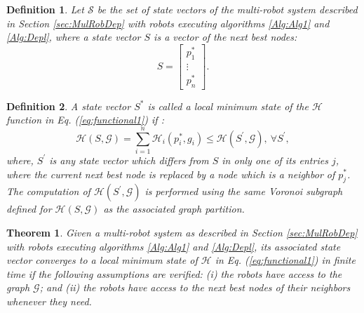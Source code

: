 \documentclass[smallcondensed]{svjour3}
\newtheorem{mytheorem}{Theorem}
\newtheorem{mydef}{Definition}
\begin{document}
%
\begin{mydef}
Let $\mathcal S$ be the set of state vectors of the multi-robot system described in Section \ref{sec:MulRobDep} with robots executing algorithms \ref{Alg:Alg1} and \ref{Alg:Depl}, where a state vector $S$ is a vector of the next best nodes:
%
\[
S=
\begin{bmatrix}
p_1^*\\
\vdots\\
p_n^*
\end{bmatrix}.\]
\end{mydef}

\begin{mydef}
\label{def4}
A state vector $S^*$ is called a local minimum state of the $\mathcal H$ function in Eq. (\ref{eq:functional1}) if :
%
\[\mathcal H(S,\mathcal G)=\sum_{i = 1}^{n} \mathcal H_i(p_i^*,g_i) \leq \mathcal H(S^\prime,\mathcal G), ~\forall S^\prime, \]
%
where, $S^\prime$ is any state vector which differs from $S$ in only one of its entries $j$, where the current next best node is replaced by a node which is a neighbor of $p_j^*$. The computation of $\mathcal H(S^\prime, \mathcal G)$ is performed using the same Voronoi subgraph defined for $\mathcal H(S,\mathcal G)$ as the associated graph partition.
\end{mydef}

\begin{mytheorem}
Given a multi-robot system as described in Section \ref{sec:MulRobDep} with robots executing algorithms \ref{Alg:Alg1} and \ref{Alg:Depl}, its associated state vector converges to a local minimum state of $\mathcal H$ in Eq. (\ref{eq:functional1}) in finite time if the following assumptions are verified: (i) the robots have access to the graph $\mathcal G$;  and (ii) the robots have access to the next best nodes of their neighbors whenever they need.
\end{mytheorem}
\end{document}
